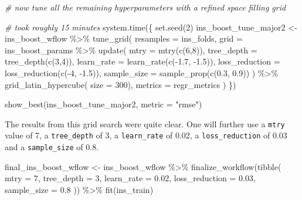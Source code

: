 \documentclass[
]{book}
\newenvironment{Shaded}{\begin{snugshade}}{\end{snugshade}}
\newcommand{\AttributeTok}[1]{\textcolor[rgb]{0.77,0.63,0.00}{#1}}
\newcommand{\CommentTok}[1]{\textcolor[rgb]{0.56,0.35,0.01}{\textit{#1}}}
\newcommand{\DecValTok}[1]{\textcolor[rgb]{0.00,0.00,0.81}{#1}}
\newcommand{\FloatTok}[1]{\textcolor[rgb]{0.00,0.00,0.81}{#1}}
\newcommand{\FunctionTok}[1]{\textcolor[rgb]{0.00,0.00,0.00}{#1}}
\newcommand{\NormalTok}[1]{#1}
\newcommand{\OtherTok}[1]{\textcolor[rgb]{0.56,0.35,0.01}{#1}}
\newcommand{\SpecialCharTok}[1]{\textcolor[rgb]{0.00,0.00,0.00}{#1}}
\newcommand{\StringTok}[1]{\textcolor[rgb]{0.31,0.60,0.02}{#1}}
\begin{document}
\begin{Shaded}
\begin{Highlighting}[]
\CommentTok{\# now tune all the remaining hyperparameters with a refined space filling grid}

\CommentTok{\# took roughly 15 minutes}
\FunctionTok{system.time}\NormalTok{(\{}
  \FunctionTok{set.seed}\NormalTok{(}\DecValTok{2}\NormalTok{)}
\NormalTok{  ins\_boost\_tune\_major2 }\OtherTok{\textless{}{-}}\NormalTok{ ins\_boost\_wflow }\SpecialCharTok{\%\textgreater{}\%}
    \FunctionTok{tune\_grid}\NormalTok{(}
      \AttributeTok{resamples =}\NormalTok{ ins\_folds,}
      \AttributeTok{grid =}\NormalTok{ ins\_boost\_params }\SpecialCharTok{\%\textgreater{}\%}
        \FunctionTok{update}\NormalTok{(}
          \AttributeTok{mtry =} \FunctionTok{mtry}\NormalTok{(}\FunctionTok{c}\NormalTok{(}\DecValTok{6}\NormalTok{,}\DecValTok{8}\NormalTok{)),}
          \AttributeTok{tree\_depth =} \FunctionTok{tree\_depth}\NormalTok{(}\FunctionTok{c}\NormalTok{(}\DecValTok{3}\NormalTok{,}\DecValTok{4}\NormalTok{)),}
          \AttributeTok{learn\_rate =} \FunctionTok{learn\_rate}\NormalTok{(}\FunctionTok{c}\NormalTok{(}\SpecialCharTok{{-}}\FloatTok{1.7}\NormalTok{, }\SpecialCharTok{{-}}\FloatTok{1.5}\NormalTok{)),}
          \AttributeTok{loss\_reduction =} \FunctionTok{loss\_reduction}\NormalTok{(}\FunctionTok{c}\NormalTok{(}\SpecialCharTok{{-}}\DecValTok{4}\NormalTok{, }\SpecialCharTok{{-}}\FloatTok{1.5}\NormalTok{)),}
          \AttributeTok{sample\_size =} \FunctionTok{sample\_prop}\NormalTok{(}\FunctionTok{c}\NormalTok{(}\FloatTok{0.3}\NormalTok{, }\FloatTok{0.9}\NormalTok{))}
\NormalTok{        ) }\SpecialCharTok{\%\textgreater{}\%}
        \FunctionTok{grid\_latin\_hypercube}\NormalTok{(}
          \AttributeTok{size =} \DecValTok{300}\NormalTok{),}
      \AttributeTok{metrics =}\NormalTok{ regr\_metrics}
\NormalTok{    )}
\NormalTok{\})}

\FunctionTok{show\_best}\NormalTok{(ins\_boost\_tune\_major2, }\AttributeTok{metric =} \StringTok{"rmse"}\NormalTok{)}
\end{Highlighting}
\end{Shaded}

The results from this grid search were quite clear. One will further use a \texttt{mtry} value of 7, a \texttt{tree\_depth} of 3, a \texttt{learn\_rate} of 0.02, a \texttt{loss\_reduction} of 0.03 and a \texttt{sample\_size} of 0.8.

\begin{Shaded}
\begin{Highlighting}[]
\NormalTok{final\_ins\_boost\_wflow }\OtherTok{\textless{}{-}} 
\NormalTok{  ins\_boost\_wflow }\SpecialCharTok{\%\textgreater{}\%} 
  \FunctionTok{finalize\_workflow}\NormalTok{(}\FunctionTok{tibble}\NormalTok{(}
    \AttributeTok{mtry =} \DecValTok{7}\NormalTok{,}
    \AttributeTok{tree\_depth =} \DecValTok{3}\NormalTok{,}
    \AttributeTok{learn\_rate =} \FloatTok{0.02}\NormalTok{,}
    \AttributeTok{loss\_reduction =} \FloatTok{0.03}\NormalTok{,}
    \AttributeTok{sample\_size =} \FloatTok{0.8}
\NormalTok{  )) }\SpecialCharTok{\%\textgreater{}\%}
  \FunctionTok{fit}\NormalTok{(ins\_train)}
\end{Highlighting}
\end{Shaded}
\end{document}
